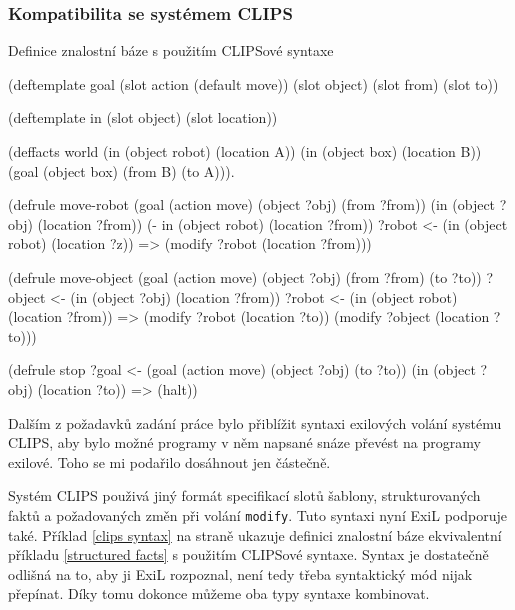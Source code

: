\subsubsection{Kompatibilita se systémem CLIPS}
\label{guide clips}

\begin{listing}[t]
\caption{Definice znalostní báze s použitím CLIPSové syntaxe}
\label{clips syntax}
\begin{clcode}
(deftemplate goal
  (slot action (default move))
  (slot object)
  (slot from)
  (slot to))

(deftemplate in
  (slot object)
  (slot location))

(deffacts world
  (in (object robot) (location A))
  (in (object box) (location B))
  (goal (object box) (from B) (to A))).

(defrule move-robot
  (goal (action move) (object ?obj) (from ?from))
  (in (object ?obj) (location ?from))
  (- in (object robot) (location ?from))
  ?robot <- (in (object robot) (location ?z))
  =>
  (modify ?robot (location ?from)))

(defrule move-object
  (goal (action move) (object ?obj) (from ?from) (to ?to))
  ?object <- (in (object ?obj) (location ?from))
  ?robot <- (in (object robot) (location ?from))
  =>
  (modify ?robot (location ?to))
  (modify ?object (location ?to)))

(defrule stop
  ?goal <- (goal (action move) (object ?obj) (to ?to))
  (in (object ?obj) (location ?to))
  =>
  (halt))
\end{clcode}
\end{listing}

Dalším z požadavků zadání práce bylo přiblížit syntaxi exilových volání systému
CLIPS, aby bylo možné programy v něm napsané snáze převést na programy exilové.
Toho se mi podařilo dosáhnout jen částečně.

\FloatBarrier

Systém CLIPS použivá jiný formát specifikací slotů šablony, strukturovaných
faktů a požadovaných změn při volání \verb|modify|. Tuto syntaxi nyní ExiL podporuje
také. Příklad \ref{clips syntax} na straně \pageref{clips syntax} ukazuje
definici znalostní báze ekvivalentní příkladu \ref{structured facts} s použitím
CLIPSové syntaxe. Syntax je dostatečně odlišná na to, aby ji ExiL rozpoznal,
není tedy třeba syntaktický mód nijak přepínat. Díky tomu dokonce můžeme oba
typy syntaxe kombinovat.

